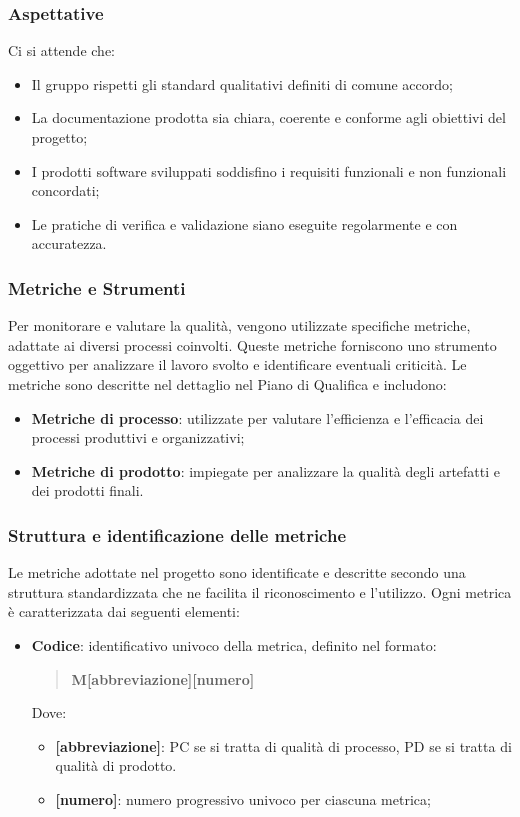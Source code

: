 \documentclass[10pt]{article}
\begin{document}
\begin{justify}
    \subsubsection{Aspettative}
    Ci si attende che:
    \begin{itemize}
        \item Il gruppo rispetti gli standard qualitativi definiti di comune accordo;
        \item La documentazione prodotta sia chiara, coerente e conforme agli obiettivi del progetto;
        \item I prodotti software sviluppati soddisfino i requisiti funzionali e non funzionali concordati;
        \item Le pratiche di verifica e validazione siano eseguite regolarmente e con accuratezza.
    \end{itemize}
    
    \subsubsection{Metriche e Strumenti}
    Per monitorare e valutare la qualità, vengono utilizzate specifiche metriche, adattate ai diversi processi coinvolti. Queste metriche forniscono uno strumento oggettivo per analizzare il lavoro svolto e identificare eventuali criticità. Le metriche sono descritte nel dettaglio nel Piano di Qualifica e includono:
    \begin{itemize}
        \item \textbf{Metriche di processo}: utilizzate per valutare l’efficienza e l’efficacia dei processi produttivi e organizzativi;
        \item \textbf{Metriche di prodotto}: impiegate per analizzare la qualità degli artefatti e dei prodotti finali.
    \end{itemize}
    
\subsubsection{Struttura e identificazione delle metriche}

Le metriche adottate nel progetto sono identificate e descritte secondo una struttura standardizzata che ne facilita il riconoscimento e l’utilizzo. Ogni metrica è caratterizzata dai seguenti elementi:

\begin{itemize}
    \item \textbf{Codice}: identificativo univoco della metrica, definito nel formato:
    \begin{quote}
        \textbf{M[abbreviazione][numero]}
    \end{quote}
    Dove:
    \begin{itemize}
        \item \textbf{[abbreviazione]}: PC se si tratta di qualità di processo, PD se si tratta di qualità di prodotto.
        \item \textbf{[numero]}: numero progressivo univoco per ciascuna metrica;
    \end{itemize}
    

\end{itemize}
\end{justify}
\end{document}
